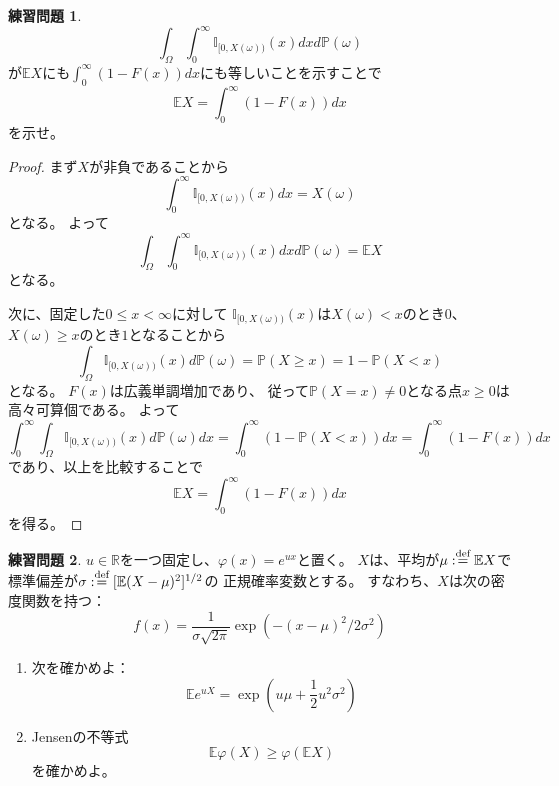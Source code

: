 \documentclass[uplatex]{jsarticle}
\theoremstyle{definition}
\newtheorem{prob}[prob]{練習問題}
\def\R{\mathbb{R}}
\def\P{\mathbb{P}}
\def\E{\mathbb{E}}
\def\I{\mathbb{I}}
\def\dfn{:\overset{\mbox{{\scriptsize def}}}{=}}
\begin{document}
\begin{prob}\label{prob: 1.5}
  \[
  \int_{\Omega}\int_0^\infty \I_{[0,X(\omega))}(x)dxd\P(\omega)
  \]
  が\(\E X\)にも\(\int_0^\infty(1-F(x))dx\)にも等しいことを示すことで
  \[
  \E X = \int_0^\infty(1-F(x))dx
  \]
  を示せ。
\end{prob}

\begin{proof}
  まず\(X\)が非負であることから
  \[
  \int_0^{\infty}\I_{[0,X(\omega))}(x)dx = X(\omega)
  \]
  となる。
  よって
  \[
  \int_{\Omega}\int_0^{\infty}\I_{[0,X(\omega))}(x)dxd\P(\omega) = \E X
  \]
  となる。

  次に、固定した\(0\leq x < \infty \)に対して
  \(\I_{[0,X(\omega))}(x)\)は\(X(\omega) < x\)のとき\(0\)、
  \(X(\omega) \geq x\)のとき\(1\)となることから
  \[
  \int_{\Omega}\I_{[0,X(\omega))}(x)d\P(\omega) = \P(X \geq x) = 1 - \P(X < x)
  \]
  となる。
  \(F(x)\)は広義単調増加であり、
  従って\(\P(X=x) \neq 0\)となる点\(x\geq 0\)は高々可算個である。
  よって
  \[
  \int_0^{\infty}\int_{\Omega}\I_{[0,X(\omega))}(x)d\P(\omega)dx
  = \int_0^{\infty}(1 - \P(X < x)) dx
  = \int_0^{\infty}(1 - F(x)) dx
  \]
  であり、以上を比較することで
  \[
  \E X = \int_0^{\infty}(1 - F(x)) dx
  \]
  を得る。
\end{proof}


\begin{prob}\label{prob: 1.6}
  \(u\in \R\)を一つ固定し、\(\varphi(x) = e^{ux}\)と置く。
  \(X\)は、平均が\(\mu \dfn \E X\)で
  標準偏差が\(\sigma \dfn [\E(X-\mu)^2]^{1/2}\)の
  正規確率変数とする。
  すなわち、\(X\)は次の密度関数を持つ：
  \[
  f(x) = \frac{1}{\sigma\sqrt{2\pi}}\exp(-(x-\mu)^2/2\sigma^2)
  \]
  \begin{enumerate}
    \item \label{enumi: 1.6-1}
    次を確かめよ：
    \[
    \E e^{uX} = \exp(u\mu + \frac{1}{2}u^2\sigma^2)
    \]
    \item \label{enumi: 1.6-2}
    Jensenの不等式
    \[
    \E \varphi(X) \geq \varphi(\E X)
    \]
    を確かめよ。
  \end{enumerate}
\end{prob}
\end{document}
